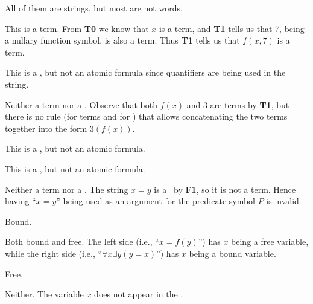 \begin{questions}
    \item All of them are strings, but most are not words.
    
    \item \begin{partquestions}{\alph*}
        \item This is a term. From \textbf{T0} we know that $x$ is a term, and \textbf{T1} tells us that 7, being a nullary function symbol, is also a term. Thus \textbf{T1} tells us that $f(x,7)$ is a term.
        \item This is a \wff, but not an atomic formula since quantifiers are being used in the string.
        \item Neither a term nor a \wff. Observe that both $f(x)$ and 3 are terms by \textbf{T1}, but there is no rule (for terms and for \wffs) that allows concatenating the two terms together into the form $3(f(x))$.
        \item This is a \wff, but not an atomic formula.
        \item This is a \wff, but not an atomic formula.
        \item Neither a term nor a \wff. The string $x=y$ is a \wff~by \textbf{F1}, so it is not a term. Hence having ``$x=y$'' being used as an argument for the predicate symbol $P$ is invalid.
    \end{partquestions}

    \item \begin{partquestions}{\alph*}
        \item Bound.
        \item Both bound and free. The left side (i.e., ``$x=f(y)$'') has $x$ being a free variable, while the right side (i.e., ``$\forall x \exists y (y = x)$'') has $x$ being a bound variable.
        \item Free.
        \item Neither. The variable $x$ does not appear in the \wff.
    \end{partquestions}
\end{questions}
